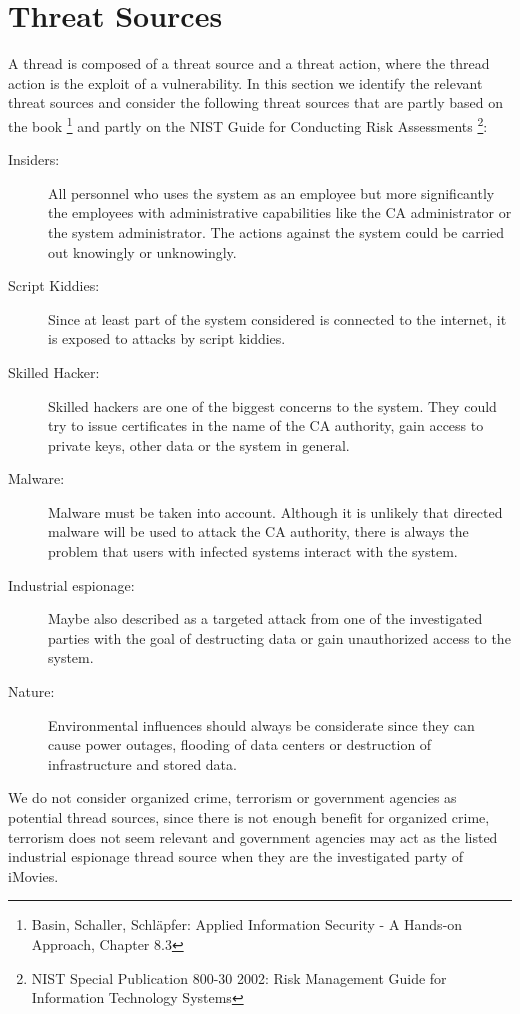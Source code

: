 \documentclass[a4paper, toc=index, 12pt, DIV14, twoside, BCOR2cm, headsepline, numbers=noenddot, bibliography=totoc]{scrbook}
\begin{document}
\section{Threat Sources}
A thread is composed of a threat source and a threat action, where the thread action is the exploit of a vulnerability. In this section we identify the relevant threat sources and consider the following threat sources that are partly based on the book \footnote{Basin, Schaller, Schläpfer: Applied Information Security - A Hands-on Approach, Chapter 8.3} and partly on the NIST Guide for Conducting Risk Assessments \footnote{NIST Special Publication 800-30 2002: Risk Management Guide for Information Technology Systems}:
\begin{description}
\item[Insiders:] All personnel who uses the system as an employee but more significantly the employees with administrative capabilities like the CA administrator or the system administrator. The actions against the system could be carried out knowingly or unknowingly.

\item[Script Kiddies:] Since at least part of the system considered is connected to the internet, it is exposed to attacks by script kiddies.

\item[Skilled Hacker:] Skilled hackers are one of the biggest concerns to the system. They could try to issue certificates in the name of the CA authority, gain access to private keys, other data or the system in general.

\item[Malware:] Malware must be taken into account. Although it is unlikely that directed malware will be used to attack the CA authority, there is always the problem that users with infected systems interact with the system.

\item[Industrial espionage: ] Maybe also described as a targeted attack from one of the investigated parties with the goal of destructing data or gain unauthorized access to the system.

\item[Nature: ] Environmental influences should always be considerate since they can cause power outages, flooding of data centers or destruction of infrastructure and stored data.
\end{description}
We do not consider organized crime, terrorism or government agencies as potential thread sources, since there is not enough benefit for organized crime, terrorism does not seem relevant and government agencies may act as the listed industrial espionage thread source when they are the investigated party of iMovies.
\end{document}
